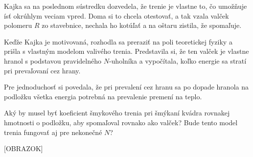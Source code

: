 Kajka sa na poslednom sústredku dozvedela, že trenie je vlastne to, čo
umožňuje ísť okrúhlym veciam vpred. Doma si to chcela otestovať, a tak
vzala valček polomeru $R$ zo stavebnice, nechala ho kotúľať a na oštaru
zistila, že spomaľuje.

Keďže Kajka je motivovaná, rozhodla sa preraziť na poli teoretickej
fyziky a prišla s vlastným modelom valivého trenia. Predstavila si, že
ten valček je vlastne hranol s podstavou pravidelného $N$-uholníka a
vypočítala, koľko energie sa stratí pri prevaľovaní cez hrany.

Pre jednoduchosť si povedala, že pri prevalení cez hranu sa po dopade
hranola na podložku všetka energia potrebná na prevalenie premení na
teplo.

Aký by musel byť koeficient šmykového trenia pri šmýkaní kvádra rovnakej
hmotnosti o podložku, aby spomaľoval rovnako ako valček? Bude tento
model trenia fungovať aj pre nekonečné $N$?

{[}OBRAZOK{]}
